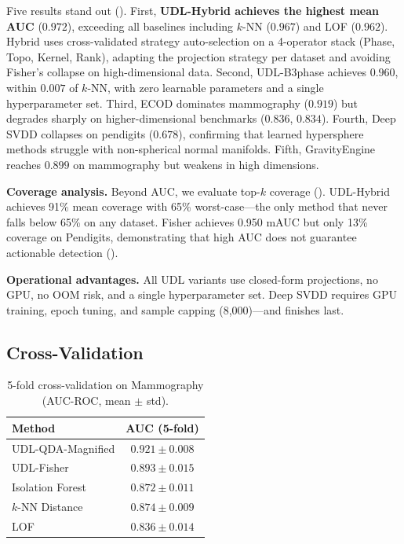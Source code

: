 \documentclass{article}
\begin{document}
Five results stand out (). First, \textbf{UDL-Hybrid achieves the highest mean AUC} ($0.972$), exceeding all baselines including $k$-NN ($0.967$) and LOF ($0.962$). Hybrid uses cross-validated strategy auto-selection on a 4-operator stack (Phase, Topo, Kernel, Rank), adapting the projection strategy per dataset and avoiding Fisher's collapse on high-dimensional data. Second, UDL-B3phase achieves $0.960$, within $0.007$ of $k$-NN, with zero learnable parameters and a single hyperparameter set. Third, ECOD dominates mammography ($0.919$) but degrades sharply on higher-dimensional benchmarks ($0.836$, $0.834$). Fourth, Deep SVDD collapses on pendigits ($0.678$), confirming that learned hypersphere methods struggle with non-spherical normal manifolds. Fifth, GravityEngine reaches $0.899$ on mammography but weakens in high dimensions.

\textbf{Coverage analysis.} Beyond AUC, we evaluate top-$k$ coverage (). UDL-Hybrid achieves 91\% mean coverage with 65\% worst-case---the only method that never falls below 65\% on any dataset. Fisher achieves 0.950 mAUC but only 13\% coverage on Pendigits, demonstrating that high AUC does not guarantee actionable detection ().

\textbf{Operational advantages.} All UDL variants use closed-form projections, no GPU, no OOM risk, and a single hyperparameter set. Deep SVDD requires GPU training, epoch tuning, and sample capping (8,000)---and finishes last.

\subsection{Cross-Validation}

\begin{table}[t]
\centering
\caption{5-fold cross-validation on Mammography (AUC-ROC, mean $\pm$ std).}
\label{tab:cv}
\begin{tabular}{@{}lc@{}}
\toprule
\textbf{Method} & \textbf{AUC (5-fold)} \\
\midrule
UDL-QDA-Magnified & $\mathbf{0.921 \pm 0.008}$ \\
UDL-Fisher & $0.893 \pm 0.015$ \\
Isolation Forest & $0.872 \pm 0.011$ \\
$k$-NN Distance & $0.874 \pm 0.009$ \\
LOF & $0.836 \pm 0.014$ \\
\bottomrule
\end{tabular}
\end{table}
\end{document}
